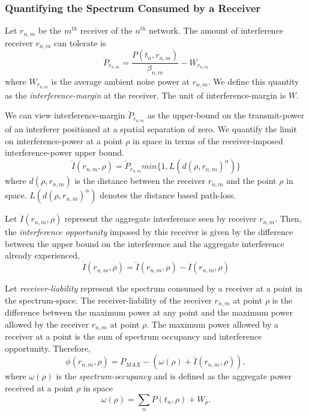 \documentclass[12pt, draftclsnofoot, onecolumn]{IEEEtran}
\begin{document}
\subsubsection{Quantifying the Spectrum Consumed by a Receiver}
\noindent
Let $r_{n,m}$ be the $m^{th}$ receiver of the $n^{th}$ network. The amount of interference receiver $r_{n,m}$ can tolerate is
\begin{equation}
\breve{P}_{r_{n,m}} = \frac{P(t_n, r_{n,m})}{\beta_{n,m}} - W_{r_{n,m}}
\end{equation}
where $W_{r_{n,m}}$ is the average ambient noise power at $r_{n,m}$. We define this quantity as the \textit{interference-margin} at the receiver. The unit of interference-margin is $W$.

We can view interference-margin $\breve{P}_{r_{n,m}}$ as the upper-bound on the transmit-power of an interferer positioned at a spatial separation of zero. We quantify the limit on interference-power at a point $\rho$ in space in terms of the receiver-imposed interference-power upper bound.
\begin{equation}
\label{eq:riub}
\breve{I}(r_{n,m}, \rho) = \breve{P}_{r_{n,m}} min\{1, L(d(\rho, r_{n,m})^{\alpha})\}
\end{equation}
where $d(\rho, r_{n,m})$ is the distance between the receiver $r_{n,m}$ and the point $\rho$ in space. $L(d(\rho, r_{n,m})^{\alpha})$ denotes the distance based path-loss.

Let $\ddot{I}(r_{n,m}, \rho)$ represent the aggregate interference seen by receiver $r_{n,m}$. Then, the \textit{interference opportunity} imposed by this receiver is given by the difference between the upper bound on the interference and the aggregate interference already experienced,
\begin{equation}
\label{eq:spoppt}
\acute{I}(r_{n,m}, \rho) = \breve{I}(r_{n,m}, \rho) -  \ddot{I}(r_{n,m}, \rho)
\end{equation}

Let \textit{receiver-liability} represent the spectrum consumed by a receiver at a point in the spectrum-space. The receiver-liability of the receiver $r_{n,m}$ at point $\rho$ is the difference between the maximum power at any point  and the maximum power allowed by the receiver $r_{n,m}$ at point $\rho$. The maximum power allowed by a receiver at a point is the sum of spectrum occupancy and interference opportunity. Therefore,
\begin{equation}
\label{eq:sprlpt}
\phi(r_{n,m}, \rho) = P_{MAX} - (\omega(\rho) + \acute{I}(r_{n,m}, \rho)) ,
\end{equation}
where $\omega(\rho)$ is the \textit{spectrum-occupancy} and is defined as the aggregate power received at a point $\rho$ in space
\begin{equation}
\label{eq:spocpt}
\omega(\rho) = \sum_{n}	P(t_n, \rho) + W_{\rho} .
\end{equation}
\end{document}
